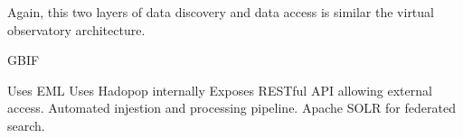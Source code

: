 \documentclass{article}
\begin{document}
Again, this two layers of data discovery and data access
is similar the virtual observatory architecture.



GBIF

Uses EML
Uses Hadopop internally
Exposes RESTful API allowing external access.
Automated injestion and processing pipeline.
Apache SOLR for federated search.





 



















%
%

\printbibliography
\end{document}
